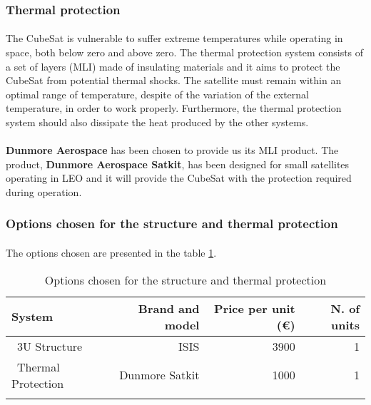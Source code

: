 \subsubsection{Thermal protection}

\paragraph{}The CubeSat is vulnerable to suffer extreme temperatures while operating in space, both below zero and above zero. The thermal protection system consists of a set of layers (MLI) made of insulating materials and it aims to protect the CubeSat from potential thermal shocks. The satellite must remain within an optimal range of temperature, despite of the variation of the external temperature, in order to work properly. Furthermore, the thermal protection system should also dissipate the heat produced by the other systems.

\paragraph{}\textbf{Dunmore Aerospace} has been chosen to provide us its MLI product. The product, \textbf{Dunmore Aerospace Satkit}, has been designed for small satellites operating in LEO and it will provide the CubeSat with the protection required during operation.

\subsubsection{Options chosen for the structure and thermal protection}
\paragraph{}The options chosen are presented in the table \ref{structurefinal}.

\begin{longtable}{| l | r | r | r | }
\hline
\rowcolor[gray]{0.80}	\textbf{System} &  \textbf{Brand and model}     & \textbf{Price per unit (\euro)} & \textbf{N. of units}  \\
\hline
\endfirsthead

	   ~3U Structure & ISIS & 3900 & 1 \\
	   \hline
	   ~Thermal Protection & Dunmore Satkit & 1000 & 1\\
	\hline

\caption{Options chosen for the structure and thermal protection}
\label{structurefinal}
\end{longtable}

